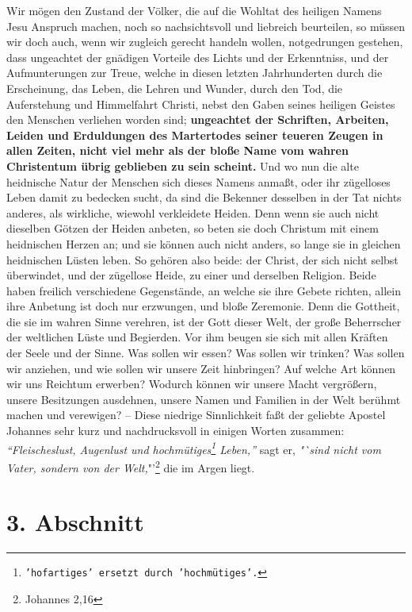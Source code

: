 \label{ref:01_02_urchristentum} Wir mögen den Zustand der Völker, die auf die Wohltat des heiligen Namens Jesu
Anspruch machen, noch so nachsichtsvoll und liebreich beurteilen, so müssen wir
doch auch, wenn wir zugleich gerecht handeln wollen, notgedrungen gestehen, dass
ungeachtet der gnädigen Vorteile des Lichts und der Erkenntniss, und der
Aufmunterungen zur Treue, welche in diesen letzten Jahrhunderten durch die
Erscheinung, das Leben, die Lehren und Wunder, durch den Tod, die Auferstehung
und Himmelfahrt Christi, nebst den Gaben seines heiligen Geistes den Menschen
verliehen worden sind; \textbf{ungeachtet der Schriften, Arbeiten, Leiden und
Erduldungen des Martertodes seiner teueren Zeugen in allen Zeiten, nicht viel
mehr als der bloße Name vom wahren Christentum übrig geblieben zu sein
scheint.} Und wo nun die alte heidnische Natur der Menschen sich dieses Namens
anmaßt, oder ihr zügelloses Leben damit zu bedecken sucht, da sind die Bekenner
desselben in der Tat nichts anderes, als wirkliche, wiewohl verkleidete Heiden.
Denn wenn sie auch nicht dieselben Götzen der Heiden anbeten, so beten sie doch
Christum mit einem heidnischen Herzen an; und sie können auch nicht anders, so
lange sie in gleichen heidnischen Lüsten leben. So gehören also beide: der
Christ, der sich nicht selbst überwindet, und der zügellose Heide, zu einer und
derselben Religion. Beide haben freilich verschiedene Gegenstände,
an welche sie ihre Gebete richten, allein ihre Anbetung ist doch nur erzwungen,
und bloße Zeremonie. Denn die Gottheit, die sie im wahren Sinne verehren, ist
der Gott dieser Welt, der große Beherrscher der weltlichen Lüste und Begierden.
Vor ihm beugen sie sich mit allen Kräften der Seele und der Sinne. Was sollen
wir essen? Was sollen wir trinken? Was sollen wir anziehen, und wie sollen wir
unsere Zeit hinbringen? Auf welche Art können wir uns Reichtum erwerben?
Wodurch können wir unsere Macht vergrößern, unsere Besitzungen ausdehnen, unsere
Namen und Familien in der Welt berühmt machen und verewigen? -- Diese niedrige
Sinnlichkeit faßt der geliebte Apostel Johannes sehr kurz und nachdrucksvoll in
einigen Worten zusammen:
\textit{"`Fleischeslust, Augenlust und hochmütiges\footnote{\texttt{'hofartiges' ersetzt durch 'hochmütiges'.}}
Leben,"'} sagt er, \textit{"`sind nicht vom Vater, sondern von der Welt,}"'\footnote{Johannes 2,16}
die im Argen liegt.

\section{3. Abschnitt} \label{kap1_ab3}

